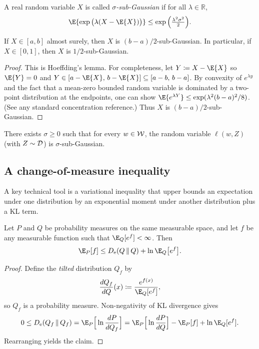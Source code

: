 \documentclass{article}
\numberwithin{equation}{section}
\newcommand{\KLnat}[2]{D_{\mathrm{e}}\!\left(#2\,\middle\|\,#2\right)}
\newcommand{\field}[1]{\mathbb{#1}}
\newcommand{\fR}{\field{R}} %
\newcommand{\cD}{{\cal D}}
\newcommand{\cW}{{\cal W}}
\begin{document}
\begin{definition}
A real random variable $X$ is called \emph{$\sigma$-sub-Gaussian} if for all $\lambda\in\fR$,
\begin{equation}
    \E{\exp\big(\lambda(X-\E{X})\big)} \le \exp\Big(\tfrac{\lambda^2\sigma^2}{2}\Big).
\end{equation}
\end{definition}

\begin{lemma}
\label{lem:hoeffding-lemma}
If $X\in[a,b]$ almost surely, then $X$ is $(b-a)/2$-sub-Gaussian.
In particular, if $X\in[0,1]$, then $X$ is $1/2$-sub-Gaussian.
\end{lemma}
\begin{proof}
This is Hoeffding's lemma.
For completeness, let $Y\coloneqq X-\E{X}$ so $\E{Y}=0$ and $Y\in[a-\E{X},\,b-\E{X}]\subseteq[a-b,\,b-a]$.
By convexity of $e^{\lambda y}$ and the fact that a mean-zero bounded random variable is dominated by a two-point distribution at the endpoints, one can show
\(\E{e^{\lambda Y}}\le \exp(\lambda^2(b-a)^2/8)\).
(See any standard concentration reference.)
Thus $X$ is $(b-a)/2$-sub-Gaussian.
\end{proof}

\begin{assumption}
\label{ass:subgaussian-loss}
There exists $\sigma\ge 0$ such that for every $w\in\cW$, the random variable $\ell(w,Z)$ (with $Z\sim\cD$) is $\sigma$-sub-Gaussian.
\end{assumption}

\subsection{A change-of-measure inequality}

A key technical tool is a variational inequality that upper bounds an expectation under one distribution by an exponential moment under another distribution plus a KL term.

\begin{lemma}
\label{lem:change-of-measure}
Let $P$ and $Q$ be probability measures on the same measurable space, and let $f$ be any measurable function such that $\E_Q[e^{f}]<\infty$.
Then
\begin{equation}
    \E_P[f] \le \KLnat{P}{Q} + \ln \E_Q\big[e^{f}\big].
\end{equation}
\end{lemma}
\begin{proof}
Define the \emph{tilted} distribution $Q_f$ by
\begin{equation}
    \frac{dQ_f}{dQ}(x) \coloneqq \frac{e^{f(x)}}{\E_Q[e^{f}]},
\end{equation}
so $Q_f$ is a probability measure.
Non-negativity of KL divergence gives
\begin{equation}
    0 \le \KLnat{P}{Q_f} = \E_P\Big[\ln\frac{dP}{dQ_f}\Big]
    = \E_P\Big[\ln\frac{dP}{dQ}\Big] - \E_P[f] + \ln\E_Q[e^{f}].
\end{equation}
Rearranging yields the claim.
\end{proof}
\end{document}
